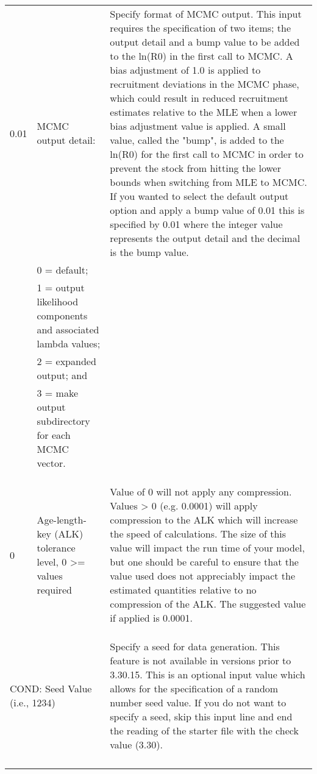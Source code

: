 {\begin{landscape}
\begin{longtable}{p{1.5cm} p{7.2cm} p{12.3cm}}
  \hline
  0.01 & MCMC output detail: & \multirow{1}{1cm}[-0.25cm]{\parbox{12.5cm}{Specify format of MCMC output. This input requires the specification of two items; the output detail and a bump value to be added to the ln(R0) in the first call to MCMC. A bias adjustment of 1.0 is applied to recruitment deviations in the MCMC phase, which could result in reduced recruitment estimates relative to the MLE when a lower bias adjustment value is applied.  A small value, called the "bump", is added to the ln(R0) for the first call to MCMC in order to prevent the stock from hitting the lower bounds when switching from MLE to MCMC. If you wanted to select the default output option and apply a bump value of 0.01 this is specified by 0.01 where the integer value represents the output detail and the decimal is the bump value.}} \Tstrut\\
  & 0 = default; & \\
  & 1 = output likelihood components and associated lambda values; &  \\
  & 2 = expanded output; and &  \\		 
  & 3 = make output subdirectory for each MCMC vector. &  \\
  & & \\
  & & \\ 
  & & \\  		 
  
  \hline
  \hypertarget{ALK}{0} & Age-length-key (ALK) tolerance level, 0 >= values required & \multirow{1}{1cm}[-0.25cm]{\parbox{12.5cm}{Value of 0 will not apply any compression.  Values > 0 (e.g. 0.0001) will apply compression to the ALK which will increase the speed of calculations.  The size of this value will impact the run time of your model, but one should be careful to ensure that the value used does not appreciably impact the estimated quantities relative to no compression of the ALK.  The suggested value if applied is 0.0001.}} \Tstrut\\ 
  & & \\
  & & \\
  & & \Bstrut\\
  
  \hline  
  \multicolumn{2}{l}{COND: Seed Value (i.e., 1234)}& \multirow{1}{1cm}[-0.25cm]{\parbox{12.5cm}{Specify a seed for data generation. This feature is not available in versions prior to 3.30.15. This is an optional input value which allows for the specification of a random number seed value.  If you do not want to specify a seed, skip this input line and end the reading of the starter file with the check value (3.30). }} \Tstrut\\
  & & \\ 
  & & \\
  & & \\ 
  & & \\
  

\end{longtable}
\end{landscape}}
